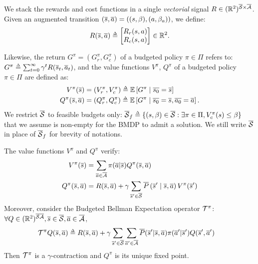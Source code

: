 We stack the rewards and cost functions in a single \emph{vectorial} signal $R \in (\mathbb{R}^2)^{{\overline{\mathcal{S}} \times \overline{\mathcal{A}}}}$.
Given an augmented transition $(\overline{s}, \overline{a}) =((s,\beta), (a, \beta_a))$, we define:
\begin{equation}
R(\os, \oa) \eqdef  \begin{bmatrix}
R_r(s, a)\\
R_c(s, a)
\end{bmatrix}\in\Real^2.
\end{equation}


Likewise, the return $G^\pi = (G_r^\pi, G_c^\pi)$ of a budgeted policy $\pi\in\Pi$ refers to:
$G^\pi \eqdef \sum_{t=0}^\infty \gamma^t R(\os_t, \oa_t)$,
and the value functions $V^\pi$, $Q^\pi$ of a budgeted policy $\pi\in\Pi$ are defined as:
\begin{align}
\label{eq:value-function}
V^\pi(\os) &= (V_r^\pi, V_c^\pi) \eqdef \expectedvalue\left[ G^\pi \condbar \ov{s_0} = \os\right]\\ Q^\pi(\os, \oa)&= (Q_r^\pi, Q_c^\pi) \eqdef \expectedvalue\left[ G^\pi \condbar \ov{s_0} = \os, \ov{a_0} = \oa\right].
\end{align}
We restrict $\overline{\mathcal{S}}$ to feasible budgets only: $\ocS_f \eqdef \{(s,\beta)\in\ocS: \exists \pi\in\Pi, V_c^\pi(s) \leq \beta\}$ that we assume is non-empty for the BMDP to admit a solution. We still write $\overline{\mathcal{S}}$ in place of $\overline{\mathcal{S}}_f$ for brevity of notations.

\begin{proposition}
	\begin{leftbar}[propositionbar]
	\label{prop:bellman-expectation}
	The value functions $V^\pi$ and $ Q^\pi$ verify:
	\begin{align}
	V^\pi(\overline{s}) &= \sum_{\overline{a}\in\overline{\mathcal{A}}}\pi(\overline{a} | \overline{s}) Q^\pi(\overline{s}, \overline{a}) \\ Q^\pi(\overline{s}, \overline{a}) &= R(\overline{s}, \overline{a}) + \gamma\sum_{\overline{s}'\in\overline{\mathcal{S}}}\overline{P}\left(\overline{s}' \;\middle|\; \overline{s}, \overline{a}\right) V^\pi(\overline{s}') \label{eq:bellman_expectation}
	\end{align}
	Moreover, consider the Budgeted Bellman Expectation operator $\mathcal{T}^\pi$:
	$\forall Q\in(\mathbb{R}^2)^{\overline{\mathcal{S}}\overline{\mathcal{A}}}, \overline{s}\in\overline{\mathcal{S}}, \overline{a}\in\overline{\mathcal{A}}$,
	\begin{align}
	\label{eq:bellman_expectation_operator}
	\cT^\pi Q(\os, \oa) &\eqdef R(\os, \oa) + \gamma \sum_{\os'\in\ocS}\sum_{\oa'\in\ocA}\ov{P}(\os'|\os, \oa)\pi(\oa'|\os') Q(\os', \oa')
	\end{align}
	Then $\mathcal{T}^\pi$ is a $\gamma$-contraction and $Q^\pi$ is its unique fixed point.
	\end{leftbar}
\end{proposition}

